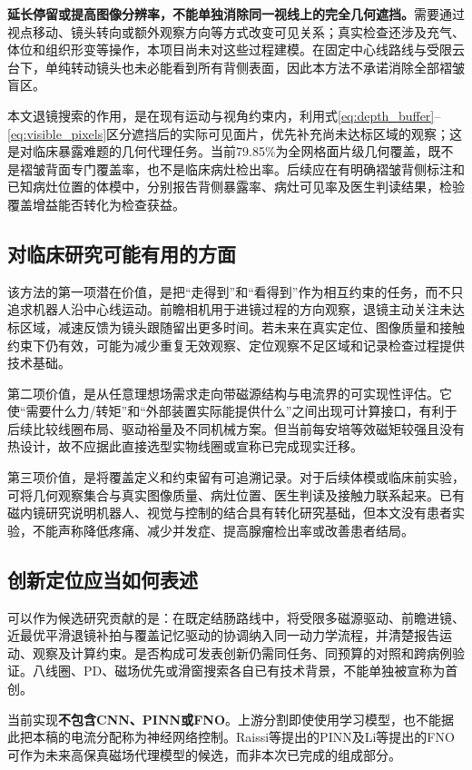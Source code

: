 \documentclass[UTF8,a4paper,zihao=5,fontset=windows]{ctexart}
\begin{document}
\textbf{延长停留或提高图像分辨率，不能单独消除同一视线上的完全几何遮挡。}需要通过视点移动、镜头转向或额外观察方向等方式改变可见关系；真实检查还涉及充气、体位和组织形变等操作，本项目尚未对这些过程建模。在固定中心线路线与受限云台下，单纯转动镜头也未必能看到所有背侧表面，因此本方法不承诺消除全部褶皱盲区。

本文退镜搜索的作用，是在现有运动与视角约束内，利用式\eqref{eq:depth_buffer}--\eqref{eq:visible_pixels}区分遮挡后的实际可见面片，优先补充尚未达标区域的观察；这是对临床暴露难题的几何代理任务。当前79.85\%为全网格面片级几何覆盖，既不是褶皱背面专门覆盖率，也不是临床病灶检出率。后续应在有明确褶皱背侧标注和已知病灶位置的体模中，分别报告背侧暴露率、病灶可见率及医生判读结果，检验覆盖增益能否转化为检查获益。

\subsection{对临床研究可能有用的方面}
该方法的第一项潜在价值，是把“走得到”和“看得到”作为相互约束的任务，而不只追求机器人沿中心线运动。前瞻相机用于进镜过程的方向观察，退镜主动关注未达标区域，减速反馈为镜头跟随留出更多时间。若未来在真实定位、图像质量和接触约束下仍有效，可能为减少重复无效观察、定位观察不足区域和记录检查过程提供技术基础。

第二项价值，是从任意理想场需求走向带磁源结构与电流界的可实现性评估。它使“需要什么力/转矩”和“外部装置实际能提供什么”之间出现可计算接口，有利于后续比较线圈布局、驱动裕量及不同机械方案。但当前每安培等效磁矩较强且没有热设计，故不应据此直接选型实物线圈或宣称已完成现实迁移。

第三项价值，是将覆盖定义和约束留有可追溯记录。对于后续体模或临床前实验，可将几何观察集合与真实图像质量、病灶位置、医生判读及接触力联系起来。已有磁内镜研究说明机器人、视觉与控制的结合具有转化研究基础\cite{martin2020}，但本文没有患者实验，不能声称降低疼痛、减少并发症、提高腺瘤检出率或改善患者结局。

\subsection{创新定位应当如何表述}
可以作为候选研究贡献的是：在既定结肠路线中，将受限多磁源驱动、前瞻进镜、近最优平滑退镜补拍与覆盖记忆驱动的协调纳入同一动力学流程，并清楚报告运动、观察及计算约束。是否构成可发表创新仍需同任务、同预算的对照和跨病例验证。八线圈、PD、磁场优先或滑窗搜索各自已有技术背景，不能单独被宣称为首创。

当前实现\textbf{不包含CNN、PINN或FNO}。上游分割即使使用学习模型，也不能据此把本稿的电流分配称为神经网络控制。Raissi等提出的PINN\cite{raissi2019}及Li等提出的FNO\cite{li2021}可作为未来高保真磁场代理模型的候选，而非本次已完成的组成部分。
\end{document}
